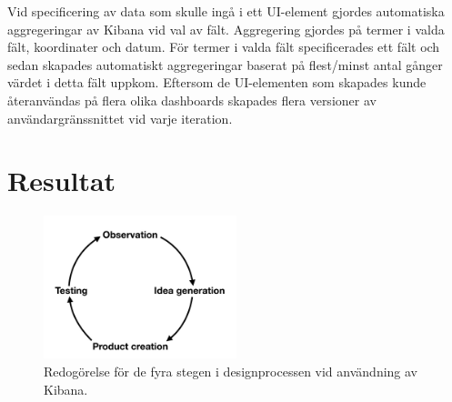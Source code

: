 \documentclass{kththesis}
\begin{document}
Vid specificering av data som skulle ingå i ett UI-element gjordes automatiska aggregeringar av Kibana vid val av fält. Aggregering gjordes på termer i valda fält, koordinater och datum. För termer i valda fält specificerades ett fält och sedan skapades automatiskt aggregeringar baserat på flest/minst antal gånger värdet i detta fält uppkom. Eftersom de UI-elementen som skapades kunde återanvändas på flera olika dashboards skapades flera versioner av användargränssnittet vid varje iteration. 

\chapter{Resultat}

\begin{figure}[h]

\centering
\includegraphics[width=0.5\textwidth]{ProductCreation}
\caption{Redogörelse för de fyra stegen i designprocessen vid användning av Kibana.}
\end{figure}
\end{document}
